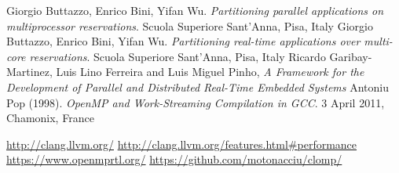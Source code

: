 \documentclass[a4paper,11pt,oneside]{book}
\begin{document}
\begin{thebibliography}{9}
 Giorgio Buttazzo, Enrico Bini, Yifan Wu. \emph{Partitioning parallel applications on multiprocessor reservations}. Scuola Superiore Sant’Anna, Pisa, Italy
 Giorgio Buttazzo, Enrico Bini, Yifan Wu. \emph{Partitioning real-time applications over multi-core reservations}. Scuola Superiore Sant’Anna, Pisa, Italy
 Ricardo Garibay-Martinez, Luis Lino Ferreira and Luis Miguel Pinho, \emph{A Framework for the Development of Parallel and Distributed Real-Time Embedded Systems}
Antoniu Pop (1998). \emph{OpenMP and Work-Streaming Compilation in GCC}. 3 April 2011, Chamonix, France

\url{http://clang.llvm.org/}
\url{http://clang.llvm.org/features.html\#performance}
\url{https://www.openmprtl.org/}
\url{https://github.com/motonacciu/clomp/}

\end{thebibliography}
\end{document}
